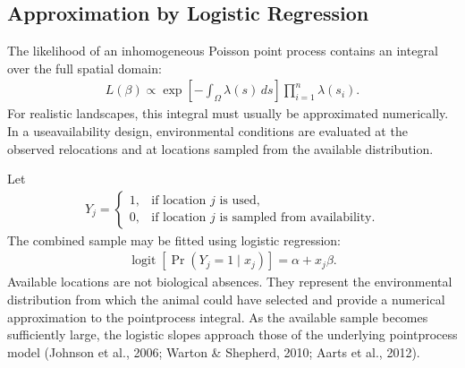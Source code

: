 \documentclass[letterpaper,10pt,english]{sphinxmanual}
\begin{document}
\subsection{Approximation by Logistic Regression}
\label{\detokenize{theory:approximation-by-logistic-regression}}
\sphinxAtStartPar
The likelihood of an inhomogeneous Poisson point process contains an integral over the full spatial domain:
\begin{equation*}
\begin{split}
L(\beta)
\propto
\exp
\left[
-\int_{\Omega}\lambda(s)\,ds
\right]
\prod_{i=1}^{n}
\lambda(s_i).
\end{split}
\end{equation*}
\sphinxAtStartPar
For realistic landscapes, this integral must usually be approximated numerically. In a use\textendash{}availability design, environmental conditions are evaluated at the observed relocations and at locations sampled from the available distribution.

\sphinxAtStartPar
Let
\begin{equation*}
\begin{split}
Y_j
=
\begin{cases}
1, & \text{if location }j\text{ is used},\\
0, & \text{if location }j\text{ is sampled from availability}.
\end{cases}
\end{split}
\end{equation*}
\sphinxAtStartPar
The combined sample may be fitted using logistic regression:
\begin{equation*}
\begin{split}
\operatorname{logit}
\left[
\Pr(Y_j=1\mid x_j)
\right]
=
\alpha+x_j\beta.
\end{split}
\end{equation*}
\sphinxAtStartPar
Available locations are not biological absences. They represent the environmental distribution from which the animal could have selected and provide a numerical approximation to the point\sphinxhyphen{}process integral. As the available sample becomes sufficiently large, the logistic slopes approach those of the underlying point\sphinxhyphen{}process model (Johnson et al., 2006; Warton \& Shepherd, 2010; Aarts et al., 2012).
\end{document}
